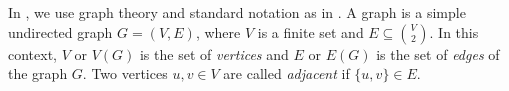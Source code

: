 In , we use graph theory and standard notation as in \cite{bondy2008graph}. A graph is a simple undirected graph $G=(V,E)$, where $V$ is a finite set and $E \subseteq \binom{V}{2}$. In this context, $V$ or $V(G)$ is the set of \emph{vertices} and $E$ or $E(G)$ is the set of \emph{edges} of the graph $G$. Two vertices $u,v\in V$ are called \emph{adjacent} if $\{u,v\} \in E$.





